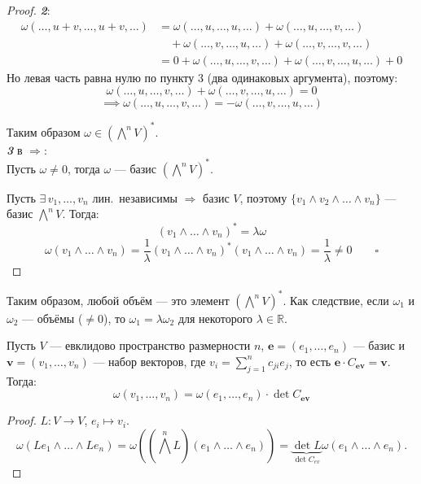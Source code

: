 \begin{stmt}
\begin{proof}
        \textbf{\emph{2}}:
        \begin{align*}
            \omega(\dots, u+v, \dots, u+v, \dots)
            &= \omega(\dots, u, \dots, u, \dots)
            + \omega(\dots, u, \dots, v, \dots) \\
            &\quad + \omega(\dots, v, \dots, u, \dots)
            + \omega(\dots, v, \dots, v, \dots) \\
            &= 0 + \omega(\dots, u, \dots, v, \dots)
            + \omega(\dots, v, \dots, u, \dots) + 0
        \end{align*}
        Но левая часть равна нулю по пункту 3 (два одинаковых аргумента), поэтому:
        \[
            \omega(\dots, u, \dots, v, \dots) + \omega(\dots, v, \dots, u, \dots) = 0
        \]
        \[
            \implies \omega(\dots, u, \dots, v, \dots) = -\omega(\dots, v, \dots, u, \dots) 
        \]

        Таким образом $\omega \in (\bigwedge^n V)^*$. \\


        \textbf{\emph{3}} в \textcircled{$\Rightarrow$}: \\
        Пусть $\omega \neq 0$, тогда
        $\omega$ --- базис $(\bigwedge^n V)^*$.

        Пусть $\exists\, v_1, \dots, v_n$ лин.\ независимы $\Rightarrow$ базис $V$,
        поэтому $\{v_1 \wedge v_2 \wedge \dots \wedge v_n\}$ --- базис $\bigwedge^n V$. Тогда:
        \[
            (v_1 \wedge \dots \wedge v_n)^* = \lambda\omega
        \]
        \[
            \omega(v_1 \wedge \dots \wedge v_n)
            = \frac{1}{\lambda}(v_1 \wedge \dots \wedge v_n)^*(v_1 \wedge \dots \wedge v_n)
            = \frac{1}{\lambda} \neq 0 \qquad \square
        \]

    \end{proof}
\end{stmt}



\begin{remark}
    Таким образом, любой объём --- это элемент $(\bigwedge^n V)^*$.
    Как следствие, если $\omega_1$ и $\omega_2$ --- объёмы ($\neq 0$), то
    $\omega_1 = \lambda \omega_2$ для некоторого $\lambda \in \mathbb{R}$.
\end{remark}


\begin{stmt}
    Пусть $V$ --- евклидово пространство размерности $n$,
    $\mathbf{e} = (e_1, \dots, e_n)$ --- базис и $\mathbf{v} = (v_1, \dots, v_n)$ --- набор векторов,
    где $v_i = \sum_{j=1}^{n} c_{ji} e_j$, то есть $\mathbf{e} \cdot C_{\mathbf{e}\mathbf{v}} = \mathbf{v}$. Тогда:
    \[
        \omega(v_1, \dots, v_n) = \omega(e_1, \dots, e_n) \cdot \det C_{\mathbf{e}\mathbf{v}}
    \]

    \begin{proof}
        $L \colon V \to V$, $e_i \mapsto v_i$.
        \[
            \omega(Le_1 \wedge \dots \wedge Le_n) 
            = \omega((\bigwedge^n L)(e_1 \wedge \dots \wedge e_n))
            = \underbrace{\det L}_{\det C_{ev}} \omega(e_1 \wedge \dots \wedge e_n).
        \]
    \end{proof}
\end{stmt}


